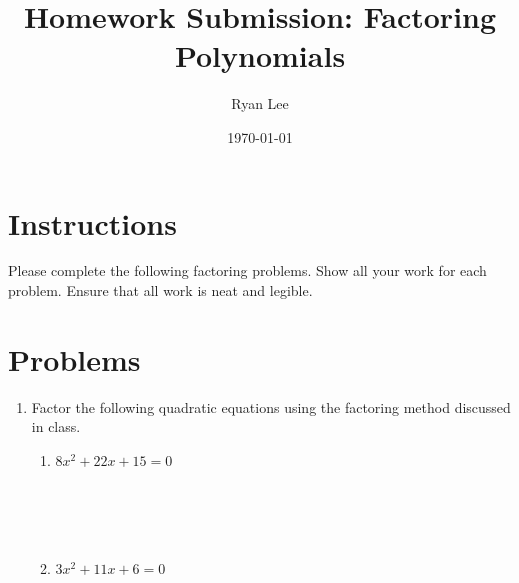 \documentclass[12pt]{article}
\title{Homework Submission: Factoring Polynomials}
\author{Ryan Lee}
\date{\today}
\begin{document}
\maketitle

\section*{Instructions}
Please complete the following factoring problems. Show all your work for each problem. Ensure that all work is neat and legible.

\section*{Problems}

\begin{enumerate}
    \item Factor the following quadratic equations using the factoring method discussed in class.
    \begin{enumerate}
        \item $8x^2 + 22x + 15 = 0$
        \[
        \begin{array}{c}
        \\ \\ \\ \\ \\ \\ \\ \\ \\ \\ \\ \\
        \end{array}
        \]

        \item $3x^2 + 11x + 6 = 0$
        \[
        \begin{array}{c}
        \\ \\ \\ \\ \\ \\ \\ \\ \\ \\ \\ \\
        \end{array}
        \]


\end{enumerate}
\end{enumerate}
\end{document}
